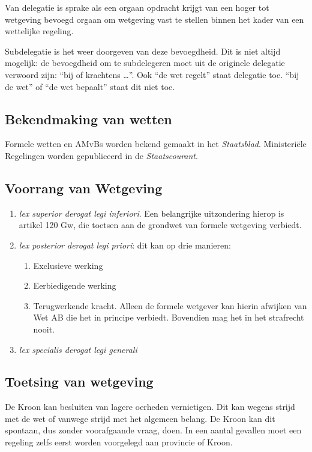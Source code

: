\documentclass{article}
\begin{document}
Van delegatie is sprake als een orgaan opdracht krijgt van een hoger tot
wetgeving bevoegd orgaan om wetgeving vast te stellen binnen het kader
van een wettelijke regeling.

Subdelegatie is het weer doorgeven van deze bevoegdheid. Dit is niet altijd mogelijk:
de bevoegdheid om te subdelegeren moet uit de originele delegatie verwoord zijn:
``bij of krachtens \ldots''. Ook ``de wet regelt'' staat delegatie toe. ``bij de wet''
of ``de wet bepaalt'' staat dit niet toe.

\subsection{Bekendmaking van wetten}

Formele wetten en AMvBs worden bekend gemaakt in het \emph{Staatsblad}. Ministeriële
Regelingen worden gepubliceerd in de \emph{Staatscourant}.

\subsection{Voorrang van Wetgeving}

\begin{enumerate}
  \item \emph{lex superior derogat legi inferiori}. Een belangrijke uitzondering hierop
    is artikel 120 Gw, die toetsen aan de grondwet van formele wetgeving verbiedt.
  \item \emph{lex posterior derogat legi priori}: dit kan op drie manieren:
    \begin{enumerate}
      \item Exclusieve werking
      \item Eerbiedigende werking
      \item Terugwerkende kracht. Alleen de formele wetgever kan hierin afwijken van Wet AB
        die het in principe verbiedt. Bovendien mag het in het strafrecht nooit.
    \end{enumerate}
  \item \emph{lex specialis derogat legi generali}
\end{enumerate}

\subsection{Toetsing van wetgeving}

De Kroon kan besluiten van lagere oerheden vernietigen. Dit kan wegens strijd
met de wet of vanwege strijd met het algemeen belang. De Kroon kan dit
spontaan, dus zonder voorafgaande vraag, doen. In een aantal gevallen moet een
regeling zelfs eerst worden voorgelegd aan provincie of Kroon.
\end{document}
